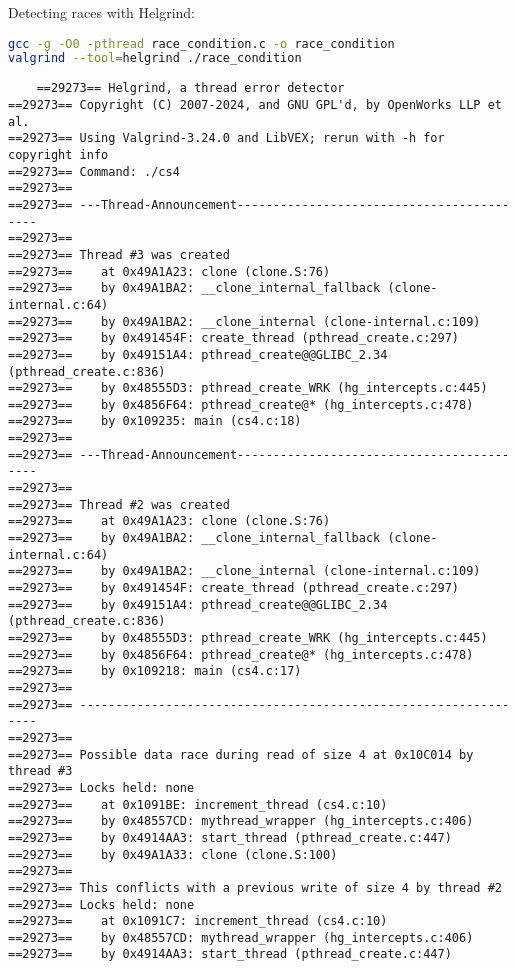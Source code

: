 \documentclass[11pt,a4paper]{article}
\begin{document}
Detecting races with Helgrind:

\begin{lstlisting}[caption=Detecting thread races with Helgrind, language=bash]
gcc -g -O0 -pthread race_condition.c -o race_condition
valgrind --tool=helgrind ./race_condition
\end{lstlisting}

\begin{verbatim}
    ==29273== Helgrind, a thread error detector
==29273== Copyright (C) 2007-2024, and GNU GPL'd, by OpenWorks LLP et al.
==29273== Using Valgrind-3.24.0 and LibVEX; rerun with -h for copyright info
==29273== Command: ./cs4
==29273== 
==29273== ---Thread-Announcement------------------------------------------
==29273== 
==29273== Thread #3 was created
==29273==    at 0x49A1A23: clone (clone.S:76)
==29273==    by 0x49A1BA2: __clone_internal_fallback (clone-internal.c:64)
==29273==    by 0x49A1BA2: __clone_internal (clone-internal.c:109)
==29273==    by 0x491454F: create_thread (pthread_create.c:297)
==29273==    by 0x49151A4: pthread_create@@GLIBC_2.34 (pthread_create.c:836)
==29273==    by 0x48555D3: pthread_create_WRK (hg_intercepts.c:445)
==29273==    by 0x4856F64: pthread_create@* (hg_intercepts.c:478)
==29273==    by 0x109235: main (cs4.c:18)
==29273== 
==29273== ---Thread-Announcement------------------------------------------
==29273== 
==29273== Thread #2 was created
==29273==    at 0x49A1A23: clone (clone.S:76)
==29273==    by 0x49A1BA2: __clone_internal_fallback (clone-internal.c:64)
==29273==    by 0x49A1BA2: __clone_internal (clone-internal.c:109)
==29273==    by 0x491454F: create_thread (pthread_create.c:297)
==29273==    by 0x49151A4: pthread_create@@GLIBC_2.34 (pthread_create.c:836)
==29273==    by 0x48555D3: pthread_create_WRK (hg_intercepts.c:445)
==29273==    by 0x4856F64: pthread_create@* (hg_intercepts.c:478)
==29273==    by 0x109218: main (cs4.c:17)
==29273== 
==29273== ----------------------------------------------------------------
==29273== 
==29273== Possible data race during read of size 4 at 0x10C014 by thread #3
==29273== Locks held: none
==29273==    at 0x1091BE: increment_thread (cs4.c:10)
==29273==    by 0x48557CD: mythread_wrapper (hg_intercepts.c:406)
==29273==    by 0x4914AA3: start_thread (pthread_create.c:447)
==29273==    by 0x49A1A33: clone (clone.S:100)
==29273== 
==29273== This conflicts with a previous write of size 4 by thread #2
==29273== Locks held: none
==29273==    at 0x1091C7: increment_thread (cs4.c:10)
==29273==    by 0x48557CD: mythread_wrapper (hg_intercepts.c:406)
==29273==    by 0x4914AA3: start_thread (pthread_create.c:447)

\end{verbatim}
\end{document}
